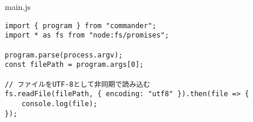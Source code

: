 \begin{listtitle}
main.js
\end{listtitle}
\begin{lstlisting}
import { program } from "commander";
import * as fs from "node:fs/promises";

program.parse(process.argv);
const filePath = program.args[0];

// ファイルをUTF-8として非同期で読み込む
fs.readFile(filePath, { encoding: "utf8" }).then(file => {
    console.log(file);
});
\end{lstlisting}
\listend

